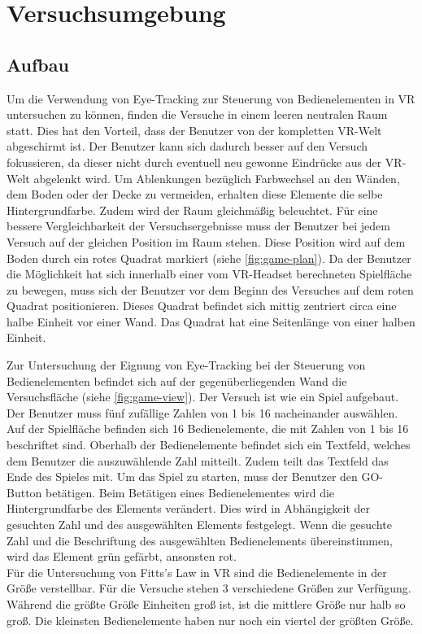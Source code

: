 
\chapter{Versuchsumgebung}

\section{Aufbau}
Um die Verwendung von Eye-Tracking zur Steuerung von Bedienelementen in \ac{VR} untersuchen zu können, finden die Versuche in einem leeren neutralen Raum statt. Dies hat den Vorteil, dass der Benutzer von der kompletten \ac{VR}-Welt abgeschirmt ist. Der Benutzer kann sich dadurch besser auf den Versuch fokussieren, da dieser nicht durch eventuell neu gewonne Eindrücke aus der \ac{VR}-Welt abgelenkt wird. Um Ablenkungen bezüglich Farbwechsel an den Wänden, dem Boden oder der Decke zu vermeiden, erhalten diese Elemente die selbe Hintergrundfarbe. Zudem wird der Raum gleichmäßig beleuchtet. Für eine bessere Vergleichbarkeit der Versuchsergebnisse muss der Benutzer bei jedem Versuch auf der gleichen Position im Raum stehen. Diese Position wird auf dem Boden durch ein rotes Quadrat markiert (siehe \autoref{fig:game-plan}). Da der Benutzer die Möglichkeit hat sich innerhalb einer vom \ac{VR}-Headset berechneten Spielfläche zu bewegen, muss sich der Benutzer vor dem Beginn des Versuches auf dem roten Quadrat positionieren. Dieses Quadrat befindet sich mittig zentriert circa eine halbe Einheit vor einer Wand. Das Quadrat hat eine Seitenlänge von einer halben Einheit.

Zur Untersuchung der Eignung von Eye-Tracking bei der Steuerung von Bedienelementen befindet sich auf der gegenüberliegenden Wand die Versuchsfläche (siehe \autoref{fig:game-view}). Der Versuch ist wie ein Spiel aufgebaut. Der Benutzer muss fünf zufällige Zahlen von 1 bis 16 nacheinander auswählen. Auf der Spielfläche befinden sich 16 Bedienelemente, die mit Zahlen von 1 bis 16 beschriftet sind. Oberhalb der Bedienelemente befindet sich ein Textfeld, welches dem Benutzer die auszuwählende Zahl mitteilt. Zudem teilt das Textfeld das Ende des Spieles mit. Um das Spiel zu starten, muss der Benutzer den GO-Button betätigen. Beim Betätigen eines Bedienelementes wird die Hintergrundfarbe des Elements verändert. Dies wird in Abhängigkeit der gesuchten Zahl und des ausgewählten Elements festgelegt. Wenn die gesuchte Zahl und die Beschriftung des ausgewählten Bedienelements übereinstimmen, wird das Element grün gefärbt, ansonsten rot. \\
Für die Untersuchung von Fitts's Law in \ac{VR} sind die Bedienelemente in der Größe verstellbar. Für die Versuche stehen 3 verschiedene Größen zur Verfügung. Während die größte Größe  Einheiten groß ist, ist die mittlere Größe nur halb so groß. Die kleinsten Bedienelemente haben nur noch ein viertel der größten Größe. 


